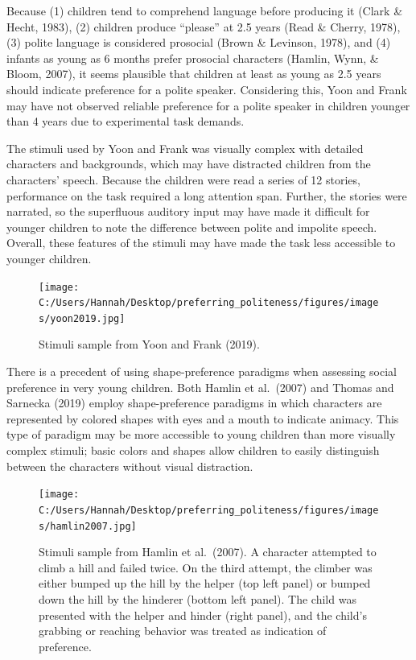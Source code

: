 \documentclass[
  english,
  man,floatsintext]{apa6}
\begin{document}
Because (1) children tend to comprehend language before producing it (Clark \& Hecht, 1983), (2) children produce ``please'' at 2.5 years (Read \& Cherry, 1978), (3) polite language is considered prosocial (Brown \& Levinson, 1978), and (4) infants as young as 6 months prefer prosocial characters (Hamlin, Wynn, \& Bloom, 2007), it seems plausible that children at least as young as 2.5 years should indicate preference for a polite speaker. Considering this, Yoon and Frank may have not observed reliable preference for a polite speaker in children younger than 4 years due to experimental task demands.

The stimuli used by Yoon and Frank was visually complex with detailed characters and backgrounds, which may have distracted children from the characters' speech. Because the children were read a series of 12 stories, performance on the task required a long attention span. Further, the stories were narrated, so the superfluous auditory input may have made it difficult for younger children to note the difference between polite and impolite speech. Overall, these features of the stimuli may have made the task less accessible to younger children.

\begin{figure}
\centering
\texttt{[image: C:/Users/Hannah/Desktop/preferring\_politeness/figures/images/yoon2019.jpg]}
\caption{Stimuli sample from Yoon and Frank (2019).}
\end{figure}

There is a precedent of using shape-preference paradigms when assessing social preference in very young children. Both Hamlin et al.~(2007) and Thomas and Sarnecka (2019) employ shape-preference paradigms in which characters are represented by colored shapes with eyes and a mouth to indicate animacy. This type of paradigm may be more accessible to young children than more visually complex stimuli; basic colors and shapes allow children to easily distinguish between the characters without visual distraction.

\begin{figure}
\centering
\texttt{[image: C:/Users/Hannah/Desktop/preferring\_politeness/figures/images/hamlin2007.jpg]}
\caption{Stimuli sample from Hamlin et al.~(2007). A character attempted to climb a hill and failed twice. On the third attempt, the climber was either bumped up the hill by the helper (top left panel) or bumped down the hill by the hinderer (bottom left panel). The child was presented with the helper and hinder (right panel), and the child's grabbing or reaching behavior was treated as indication of preference.}
\end{figure}
\end{document}
